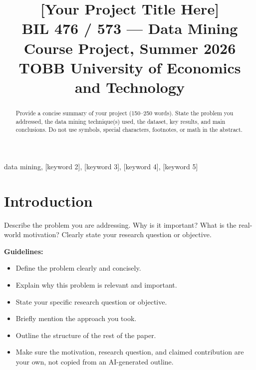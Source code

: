 \documentclass[conference]{IEEEtran}
\begin{document}
	
	\title{[Your Project Title Here]\\
		{\footnotesize BIL 476 / 573 --- Data Mining Course Project, Summer 2026\\
			TOBB University of Economics and Technology}
	}
	
	\author{
	}
	
	\maketitle
	
	\begin{abstract}
		Provide a concise summary of your project (150--250 words). State the problem you addressed, the data mining technique(s) used, the dataset, key results, and main conclusions. Do not use symbols, special characters, footnotes, or math in the abstract.
	\end{abstract}
	
	\begin{IEEEkeywords}
		data mining, [keyword 2], [keyword 3], [keyword 4], [keyword 5]
	\end{IEEEkeywords}
	
	\begin{center}
	\end{center}
	
	\section{Introduction}
	\label{sec:introduction}
	
	Describe the problem you are addressing. Why is it important? What is the real-world motivation? Clearly state your research question or objective.
	
	\textbf{Guidelines:}
	\begin{itemize}
		\item Define the problem clearly and concisely.
		\item Explain why this problem is relevant and important.
		\item State your specific research question or objective.
		\item Briefly mention the approach you took.
		\item Outline the structure of the rest of the paper.
		\item Make sure the motivation, research question, and claimed contribution are your own, not copied from an AI-generated outline.
	\end{itemize}
	
\end{document}
